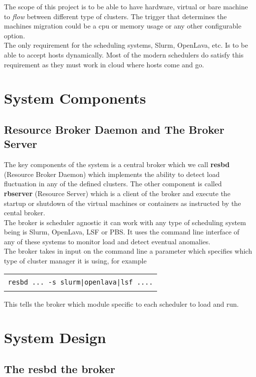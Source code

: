 \documentclass{report}
\newenvironment{boxed}
    {\begin{center}
    \begin{tabular}{|p{0.9\textwidth}|}
    \hline\\
    }
    {
    \\\\\hline
    \end{tabular}
    \end{center}
    }
\begin{document}
The scope of this project is to be able to have hardware, virtual or bare machine to \textit{flow} between different type of clusters. The trigger that determines the machines migration could be a cpu or memory usage or any other configurable option.\\

The only requirement for the scheduling systems, Slurm, OpenLava, etc. Is to be able to accept hosts dynamically. Most of the modern schedulers do satisfy this requirement as they must work in cloud where hosts come and go.

\chapter{System Components}

\section{Resource Broker Daemon and The Broker Server}
The key components of the system is a central broker which we call \textbf{resbd} (Resource Broker Daemon) which implements the ability to detect load fluctuation in any of the defined clusters. The other component is called \textbf{rbserver} (Resource Server) which is a client of the broker and execute the startup or shutdown of the virtual machines or containers as instructed by the cental broker. \\

The broker is scheduler agnostic it can work with any type of scheduling system being is Slurm, OpenLava, LSF or PBS. It uses the command line interface of any of these systems to monitor load and detect eventual anomalies. \\

The broker takes in input on the command line a parameter which specifies which type of cluster manager it is using, for example

\begin{boxed}
\texttt{resbd ... -s slurm|openlava|lsf ....}
\end{boxed}

This tells the broker which module specific to each scheduler to load and run.
\chapter{System Design}

\section{The \textbf{resbd} the broker}
\end{document}
